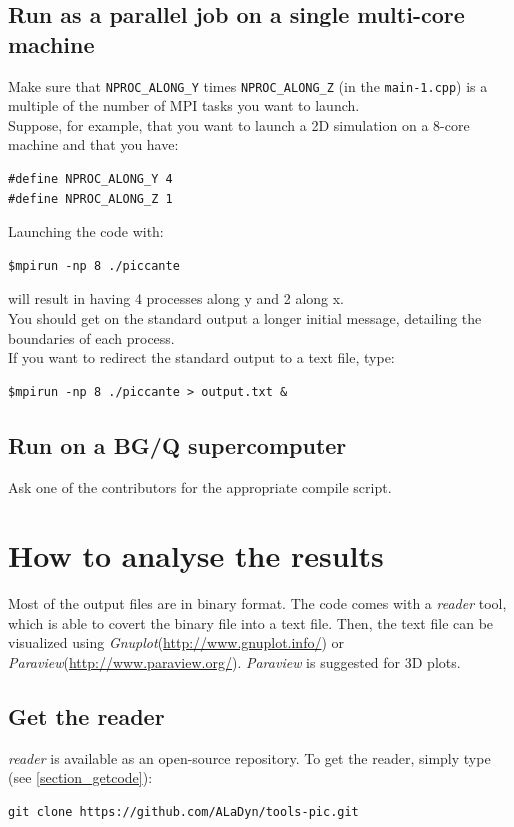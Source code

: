 \documentclass[11pt,a4paper]{report}
\begin{document}
\section{Run as a parallel job on a single multi-core machine}
Make sure that \verb+NPROC_ALONG_Y+ times  \verb+NPROC_ALONG_Z+ (in the \verb+main-1.cpp+) is a multiple of the number of MPI tasks you want to launch.\\
Suppose, for example, that you want to launch a 2D simulation on a 8-core machine and that you have:
\begin{lstlisting}
#define NPROC_ALONG_Y 4
#define NPROC_ALONG_Z 1
\end{lstlisting}
Launching the code with:
\begin{verbatim}
$mpirun -np 8 ./piccante
\end{verbatim}
will result in having 4 processes along y and 2 along x.\\
You should get on the standard output a longer initial message, detailing the boundaries of each process.\\
If you want to redirect the standard output to a text file, type:

\begin{verbatim}
$mpirun -np 8 ./piccante > output.txt &
\end{verbatim}

\section{Run on a BG/Q supercomputer}
Ask one of the contributors for the appropriate compile script.

\chapter{How to analyse the results}\label{chapter_howtoanalyse}
Most of the output files are in binary format. The code comes with a \emph{reader} tool, which is able to covert the binary file into a text file. Then, the text file can be visualized using \emph{Gnuplot}(\url{http://www.gnuplot.info/}) or \emph{Paraview}(\url{http://www.paraview.org/}). \emph{Paraview} is suggested for 3D plots.

\section{Get the reader}
\emph{reader} is available as an open-source repository. To get the reader, simply type (see \ref{section_getcode}):
\begin{verbatim}
git clone https://github.com/ALaDyn/tools-pic.git
\end{verbatim}
\end{document}
